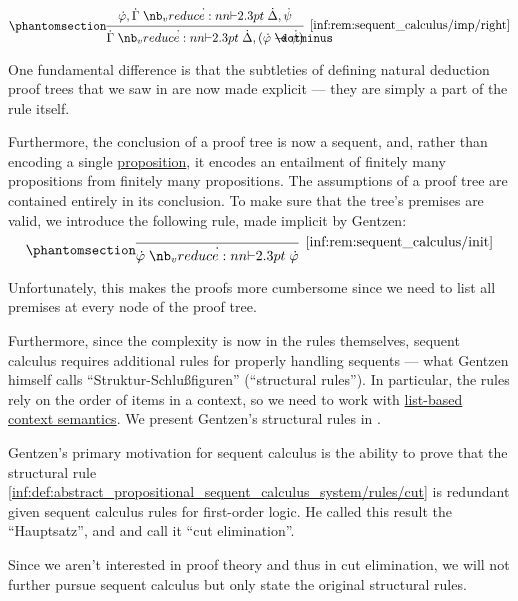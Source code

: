 \begin{remark}
\begin{paracol}{2}
    \begin{rightcolumn}
      \ParacolAlignmentHack
      \begin{equation}\taglabel[\ensuremath{ \rightarrow_R }]{inf:rem:sequent_calculus/imp/right}
        \begin{prooftree}
          \hypo{ \syn\varphi, \syn\Gamma \synvdash \syn\Delta, \syn\psi }
          \infer1[\ref{inf:rem:sequent_calculus/imp/right}]{ \syn\Gamma \synvdash \syn\Delta, (\syn\varphi \synimplies \syn\psi) }
        \end{prooftree}
      \end{equation}
    \end{rightcolumn}
  \end{paracol}

  One fundamental difference is that the subtleties of defining natural deduction proof trees that we saw in  are now made explicit --- they are simply a part of the rule itself.

  Furthermore, the conclusion of a proof tree is now a sequent, and, rather than encoding a single \hyperref[con:proposition]{proposition}, it encodes an entailment of finitely many propositions from finitely many propositions. The assumptions of a proof tree are contained entirely in its conclusion. To make sure that the tree's premises are valid, we introduce the following rule, made implicit by Gentzen:
  \begin{equation*}\taglabel[\ensuremath{ \logic{Init} }]{inf:rem:sequent_calculus/init}
    \begin{prooftree}
      \infer0[\ref{inf:rem:sequent_calculus/init}]{ \syn\varphi \synvdash \syn\varphi }.
    \end{prooftree}
  \end{equation*}

  Unfortunately, this makes the proofs more cumbersome since we need to list all premises at every node of the proof tree.

  Furthermore, since the complexity is now in the rules themselves, sequent calculus requires additional rules for properly handling sequents --- what Gentzen himself calls \enquote{Struktur-Schlu\ss{}figuren} (\enquote{structural rules}). In particular, the rules rely on the order of items in a context, so we need to work with \hyperref[def:logical_context_semantics]{list-based context semantics}. We present Gentzen's structural rules in .

  Gentzen's primary motivation for sequent calculus is the ability to prove that the structural rule \ref{inf:def:abstract_propositional_sequent_calculus_system/rules/cut} is redundant given sequent calculus rules for first-order logic. He called this result the \enquote{Hauptsatz}, and  and  call it \enquote{cut elimination}.

  Since we aren't interested in proof theory and thus in cut elimination, we will not further pursue sequent calculus but only state the original structural rules.
\end{remark}

